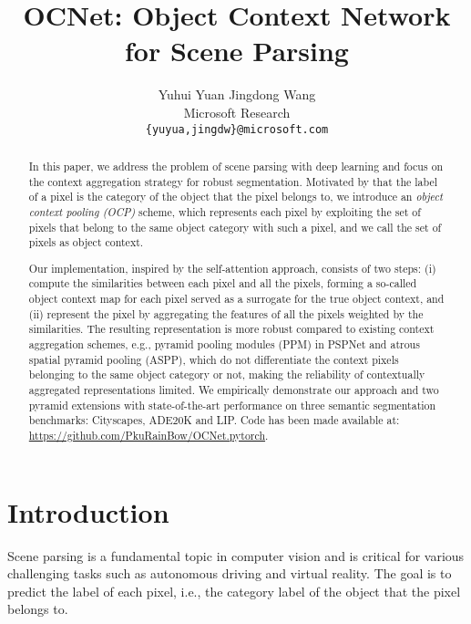 \documentclass[10pt,twocolumn,letterpaper]{article}
\begin{document}
\title{OCNet: Object Context Network for Scene Parsing}

\author{Yuhui Yuan \quad Jingdong Wang\\
Microsoft Research\\
{\tt\small \{yuyua,jingdw\}@microsoft.com}
}

\maketitle

\begin{abstract}
In this paper,
we address the problem of scene parsing
with deep learning
and focus on the context aggregation strategy
for robust segmentation.
Motivated by
that the label of a pixel is
the category of the object that the pixel belongs to,
we introduce
an \emph{object context pooling (OCP)} scheme,
which represents each pixel
by exploiting the set of pixels
that belong to the same object category
with such a pixel,
and we call the set of pixels as object context.

Our implementation, inspired by the self-attention approach,
consists of two steps:
(i) compute the similarities
between each pixel and all the pixels,
forming a so-called object context map for each pixel
served as a surrogate for the true object context,
and (ii) represent the pixel
by aggregating the features
of all the pixels
weighted by the similarities.
The resulting representation is more robust
compared to existing context aggregation schemes,
e.g., pyramid pooling modules (PPM) in PSPNet
and atrous spatial pyramid pooling (ASPP),
which do not differentiate the context pixels
belonging to the same object category or not,
making the reliability of contextually aggregated representations limited.
We empirically demonstrate our approach
and two pyramid extensions
with state-of-the-art performance on
three semantic segmentation benchmarks: Cityscapes, ADE20K and LIP.
Code has been made available at: \url{https://github.com/PkuRainBow/OCNet.pytorch}.
\end{abstract}

\section{Introduction}
Scene parsing is a fundamental topic in computer vision
and is critical for various challenging tasks such as autonomous driving and virtual reality.
The goal is to predict the label of each pixel,
i.e., the category label of the object that the pixel belongs to.
\end{document}
